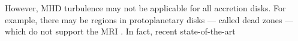 \documentclass[iop]{emulateapj}
\begin{document}
However, MHD turbulence may not be applicable for all 
accretion disks. For example, there may be regions in protoplanetary
disks --- called dead zones ---  which do not support the MRI 
\citep{gammie96,landry13}. In fact, recent state-of-the-art    





















 


\appendix




\end{document}
